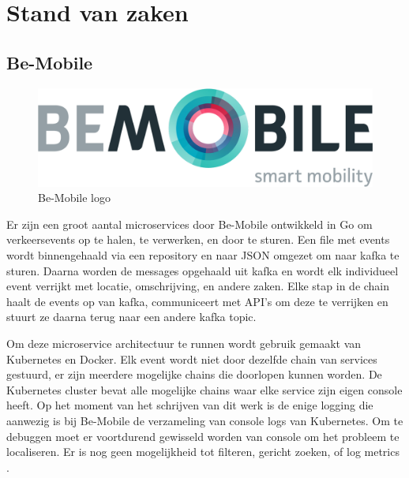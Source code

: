\chapter{Stand van zaken}
\label{ch:stand-van-zaken}


\section{Be-Mobile}
\label{sec:Be-Mobile}

\begin{figure}[ht]
    \centering
    \includegraphics[scale=0.2]{img/be-mobile-logo}
    \caption[Be-Mobile logo]{Be-Mobile logo \cite{mobile2019}}
\end{figure}
Er zijn een groot aantal microservices door Be-Mobile ontwikkeld in Go om verkeersevents op te halen, te verwerken, en door te sturen. Een file met events wordt binnengehaald via een repository en naar JSON omgezet om naar kafka te sturen. Daarna worden de messages opgehaald uit kafka en wordt elk individueel event verrijkt met locatie, omschrijving, en andere zaken. Elke stap in de chain haalt de events op van kafka, communiceert met API's om deze te verrijken en stuurt ze daarna terug naar een andere kafka topic.

Om deze microservice architectuur te runnen wordt gebruik gemaakt van Kubernetes en Docker. Elk event wordt niet door dezelfde chain van services gestuurd, er zijn meerdere mogelijke chains die doorlopen kunnen worden. De Kubernetes cluster bevat alle mogelijke chains waar elke service zijn eigen console heeft. Op het moment van het schrijven van dit werk is de enige logging die aanwezig is bij Be-Mobile de verzameling van console logs van Kubernetes. Om te debuggen moet er voortdurend gewisseld worden van console om het probleem te localiseren. Er is nog geen mogelijkheid tot filteren, gericht zoeken, of log metrics \autocite{jens2019}.

